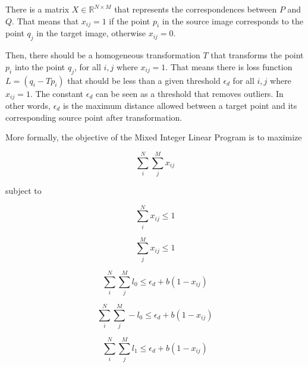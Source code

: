         There is a matrix $X \in \mathbb{R}^{N \times M}$ that represents the correspondences between $P$ and $Q$.
        That means that $x_{ij} = 1$ if the point $p_i$ in the source image corresponds to the point $q_j$ in the target image, otherwise $x_{ij} = 0$.

        Then, there should be a homogeneous transformation $T$ that transforms the point $p_i$ into the point $q_j$, for all $i, j$ where $x_{ij} = 1$.
        That means there is loss function $L = (q_i - T p_i)$ that should be less than a given threshold $\epsilon_d$
        for all $i, j$ where $x_{ij} = 1$. The constant $\epsilon_d$ can be seen as a threshold that removes outliers.
        In other words, $\epsilon_d$ is the maximum distance allowed between a target point and its corresponding source point after transformation.

        More formally, the objective of the Mixed Integer Linear Program is to maximize
        
        \begin{equation}
            \label{eq:objective_original}
            \sum_{i}^{N} \sum_{j}^{M} x_{ij}    
        \end{equation}
        
        subject to
        
        \begin{equation}
            \label{eq:subject_sum_rows}
            \sum_{i}^{N} x_{ij} \leq 1
        \end{equation}
        
        \begin{equation}
            \label{eq:subject_sum_columns}
            \sum_{j}^{M} x_{ij} \leq 1
        \end{equation}

        \begin{equation}
            \label{eq:subject_transformation_0}
            \sum_{i}^{N} \sum_{j}^{M} l_{0} \leq \epsilon_d + b (1 - x_{ij})
        \end{equation}

        \begin{equation}
            \label{eq:subject_transformation_negative_0}
            \sum_{i}^{N} \sum_{j}^{M} -l_{0} \leq \epsilon_d + b (1 - x_{ij})
        \end{equation}

        \begin{equation}
            \label{eq:subject_transformation_1}
            \sum_{i}^{N} \sum_{j}^{M} l_{1} \leq \epsilon_d + b (1 - x_{ij})
        \end{equation}

